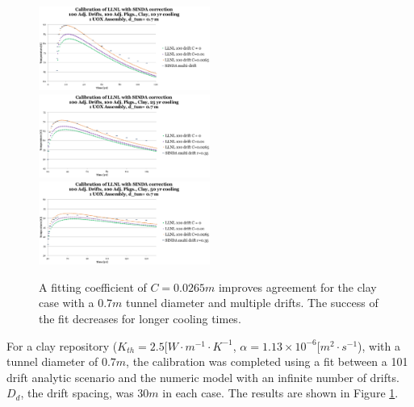 \begin{frame}
\begin{figure}[h!]
  \centering
    \includegraphics[width=0.5\textwidth]{100drift10yr.eps}
    \includegraphics[width=0.5\textwidth]{100drift25yr.eps}
    \includegraphics[width=0.5\textwidth]{100drift50yr.eps}
  \caption{A fitting coefficient of $C=0.0265m$ improves agreement for the clay 
  case with a $0.7m$ tunnel diameter and multiple drifts. The success of the fit 
  decreases for longer cooling times.}
  \label{fig:fit}
\end{figure}
\end{frame}

\begin{frame}
For a clay repository ($K_{th} = 2.5 [W\cdot m^{-1}\cdot K^{-1}$, $\alpha = 
1.13\times10^{-6}[m^2\cdot s^{-1}$), with a tunnel diameter of $0.7m$, the 
calibration was completed using a fit between a 101 drift analytic scenario 
and the numeric model with an infinite number of drifts. $D_{d}$, the drift 
spacing, was $30m$ in each case. The results are shown in Figure \ref{fig:fit}.
\end{frame}

